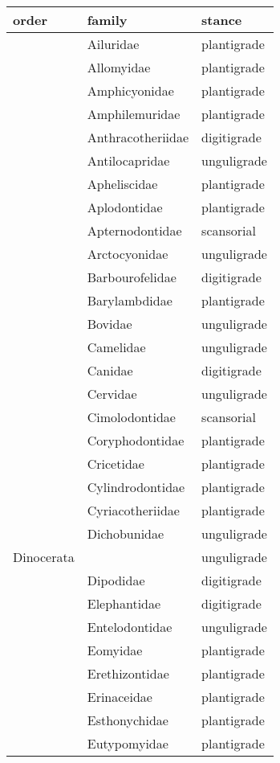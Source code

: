 \begin{table}[ht]
\centering
\begin{tabular}{lll}
  \hline
order & family & stance \\ 
  \hline
 & Ailuridae & plantigrade \\ 
   & Allomyidae & plantigrade \\ 
   & Amphicyonidae & plantigrade \\ 
   & Amphilemuridae & plantigrade \\ 
   & Anthracotheriidae & digitigrade \\ 
   & Antilocapridae & unguligrade \\ 
   & Apheliscidae & plantigrade \\ 
   & Aplodontidae & plantigrade \\ 
   & Apternodontidae & scansorial \\ 
   & Arctocyonidae & unguligrade \\ 
   & Barbourofelidae & digitigrade \\ 
   & Barylambdidae & plantigrade \\ 
   & Bovidae & unguligrade \\ 
   & Camelidae & unguligrade \\ 
   & Canidae & digitigrade \\ 
   & Cervidae & unguligrade \\ 
   & Cimolodontidae & scansorial \\ 
   & Coryphodontidae & plantigrade \\ 
   & Cricetidae & plantigrade \\ 
   & Cylindrodontidae & plantigrade \\ 
   & Cyriacotheriidae & plantigrade \\ 
   & Dichobunidae & unguligrade \\ 
  Dinocerata &  & unguligrade \\ 
   & Dipodidae & digitigrade \\ 
   & Elephantidae & digitigrade \\ 
   & Entelodontidae & unguligrade \\ 
   & Eomyidae & plantigrade \\ 
   & Erethizontidae & plantigrade \\ 
   & Erinaceidae & plantigrade \\ 
   & Esthonychidae & plantigrade \\ 
   & Eutypomyidae & plantigrade \\ 

\end{tabular}
\end{table}
